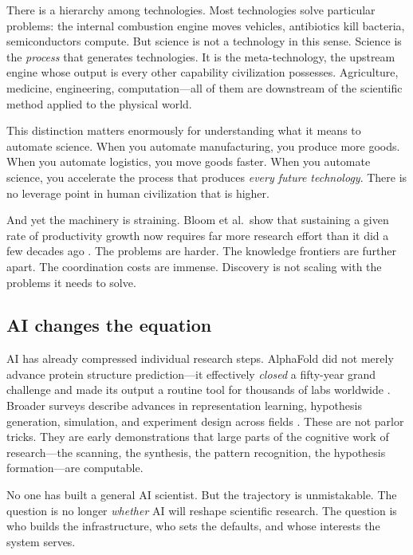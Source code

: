 \documentclass[11pt]{article}
\begin{document}
There is a hierarchy among technologies. Most technologies solve particular problems: the internal combustion engine moves vehicles, antibiotics kill bacteria, semiconductors compute. But science is not a technology in this sense. Science is the \emph{process} that generates technologies. It is the meta-technology, the upstream engine whose output is every other capability civilization possesses. Agriculture, medicine, engineering, computation---all of them are downstream of the scientific method applied to the physical world.

This distinction matters enormously for understanding what it means to automate science. When you automate manufacturing, you produce more goods. When you automate logistics, you move goods faster. When you automate science, you accelerate the process that produces \emph{every future technology}. There is no leverage point in human civilization that is higher.

And yet the machinery is straining. Bloom et al.\ show that sustaining a given rate of productivity growth now requires far more research effort than it did a few decades ago \citep{bloom2020ideas}. The problems are harder. The knowledge frontiers are further apart. The coordination costs are immense. Discovery is not scaling with the problems it needs to solve.

\subsection{AI changes the equation}

AI has already compressed individual research steps. AlphaFold did not merely advance protein structure prediction---it effectively \emph{closed} a fifty-year grand challenge and made its output a routine tool for thousands of labs worldwide \citep{jumper2021alphafold}. Broader surveys describe advances in representation learning, hypothesis generation, simulation, and experiment design across fields \citep{wang2023discovery}. These are not parlor tricks. They are early demonstrations that large parts of the cognitive work of research---the scanning, the synthesis, the pattern recognition, the hypothesis formation---are computable.

No one has built a general AI scientist. But the trajectory is unmistakable. The question is no longer \emph{whether} AI will reshape scientific research. The question is who builds the infrastructure, who sets the defaults, and whose interests the system serves.
\end{document}
